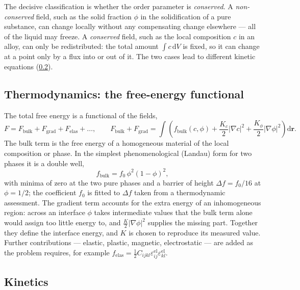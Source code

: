 \documentclass[11pt,a4paper]{article}
\numberwithin{equation}{section}
\theoremstyle{remark}
\newcommand{\fb}{f_{\mathrm{bulk}}}
\begin{document}
The decisive classification is whether the order parameter is \emph{conserved}. A
\emph{non-conserved} field, such as the solid fraction $\phi$ in the solidification of a pure
substance, can change locally without any compensating change elsewhere --- all of the liquid may
freeze. A \emph{conserved} field, such as the local composition $c$ in an alloy, can only be
redistributed: the total amount $\int c\,\mathrm{d}V$ is fixed, so it can change at a point only by a
flux into or out of it. The two cases lead to different kinetic equations (\cref{sec:kinetics}).

\subsection{Thermodynamics: the free-energy functional}\label{sec:thermo}

The total free energy is a functional of the fields,
\begin{equation}\label{eq:F}
  F = F_{\mathrm{bulk}} + F_{\mathrm{grad}} + F_{\mathrm{elas}} + \dots,
  \qquad
  F_{\mathrm{bulk}} + F_{\mathrm{grad}} = \int\left(\fb(c,\phi) + \frac{K_c}{2}|\nabla c|^2
    + \frac{K_\phi}{2}|\nabla\phi|^2\right)\mathrm{d}\bm{r}.
\end{equation}
The bulk term is the free energy of a homogeneous material of the local composition or phase. In the
simplest phenomenological (Landau) form for two phases it is a double well,
\begin{equation}\label{eq:dw}
  \fb = f_0\,\phi^2(1-\phi)^2,
\end{equation}
with minima of zero at the two pure phases and a barrier of height $\Delta f = f_0/16$ at
$\phi = 1/2$; the coefficient $f_0$ is fitted to $\Delta f$ taken from a thermodynamic assessment. The
gradient term accounts for the extra energy of an inhomogeneous region: across an interface $\phi$
takes intermediate values that the bulk term alone would assign too little energy to, and
$\tfrac{K}{2}|\nabla\phi|^2$ supplies the missing part. Together they define the interface energy, and
$K$ is chosen to reproduce its measured value. Further contributions --- elastic, plastic, magnetic,
electrostatic --- are added as the problem requires, for example
$f_{\mathrm{elas}} = \tfrac12 C_{ijkl}\varepsilon^{\mathrm{el}}_{ij}\varepsilon^{\mathrm{el}}_{kl}$.

\subsection{Kinetics}\label{sec:kinetics}
\end{document}
